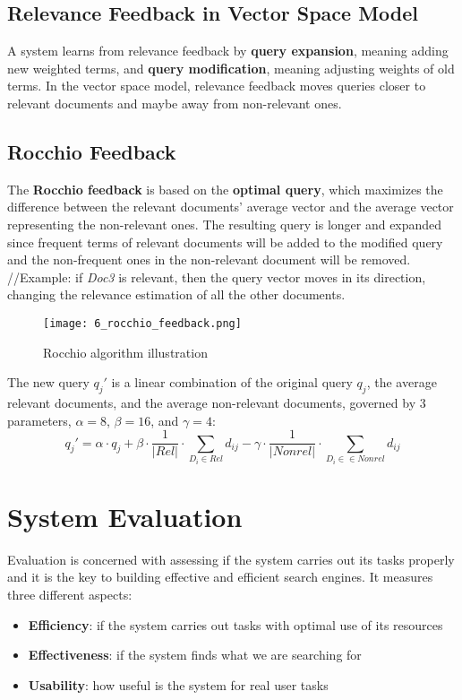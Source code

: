 \documentclass{article}
\begin{document}
\subsection{Relevance Feedback in Vector Space Model}
A system learns from relevance feedback by \textbf{query expansion}, meaning adding new weighted terms, and \textbf{query modification}, meaning adjusting weights of old terms.
In the vector space model, relevance feedback moves queries closer to relevant documents and maybe away from non-relevant ones.

\subsection{Rocchio Feedback}
The \textbf{Rocchio feedback} is based on the \textbf{optimal query}, which maximizes the difference between the relevant documents' average vector and the average vector representing the non-relevant ones. The resulting query is longer and expanded since frequent terms of relevant documents will be added to the modified query and the non-frequent ones in the non-relevant document will be removed. \\
//Example: if \textit{Doc3} is relevant, then the query vector moves in its direction, changing the relevance estimation of all the other documents.
\begin{figure}[H]
    \centering
    \texttt{[image: 6\_rocchio\_feedback.png]}
    \caption{Rocchio algorithm illustration}
\end{figure}
The new query $q_j'$ is a linear combination of the original query $q_j$, the average relevant documents, and the average non-relevant documents, governed by 3 parameters, $\alpha = 8$, $\beta = 16$, and $\gamma = 4$:
\[
    q_j' = \alpha \cdot q_j + \beta \cdot \displaystyle\frac{1}{|Rel|} \cdot \sum_{D_i \in Rel} d_{ij} - \gamma \cdot \displaystyle\frac{1}{|Nonrel|} \cdot \sum_{D_i \in \in Nonrel} d_{ij}
\]

\newpage

\section{System Evaluation}
Evaluation is concerned with assessing if the system carries out its tasks properly and it is the key to building effective and efficient search engines. It measures three different aspects:
\begin{itemize}
    \item \textbf{Efficiency}: if the system carries out tasks with optimal use of its resources
    \item \textbf{Effectiveness}: if the system finds what we are searching for
    \item \textbf{Usability}: how useful is the system for real user tasks
\end{itemize}
\end{document}
